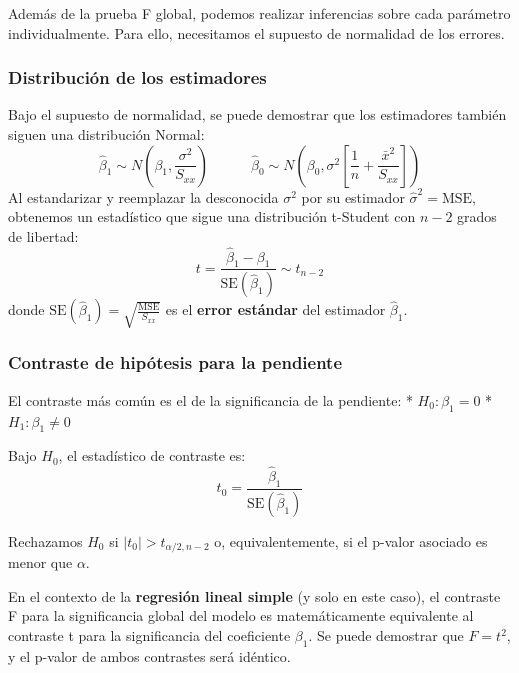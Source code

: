 \documentclass[
  letterpaper,
  DIV=11,
  numbers=noendperiod]{scrreprt}
\begin{document}
Además de la prueba F global, podemos realizar inferencias sobre cada
parámetro individualmente. Para ello, necesitamos el supuesto de
normalidad de los errores.

\subsubsection{Distribución de los
estimadores}\label{distribuciuxf3n-de-los-estimadores}

Bajo el supuesto de normalidad, se puede demostrar que los estimadores
también siguen una distribución Normal: \[
\hat{\beta}_1 \sim N\left(\beta_1, \frac{\sigma^2}{S_{xx}}\right) \quad \quad \quad \hat{\beta}_0 \sim N\left(\beta_0, \sigma^2 \left[ \frac{1}{n} + \frac{\bar{x}^2}{S_{xx}} \right]\right)
\] Al estandarizar y reemplazar la desconocida \(\sigma^2\) por su
estimador \(\hat{\sigma}^2 = \text{MSE}\), obtenemos un estadístico que
sigue una distribución t-Student con \(n-2\) grados de libertad: \[
t = \frac{\hat{\beta}_1 - \beta_1}{\text{SE}(\hat{\beta}_1)} \sim t_{n-2}\]
donde \(\text{SE}(\hat{\beta}_1) = \sqrt{\frac{\text{MSE}}{S_{xx}}}\) es
el \textbf{error estándar} del estimador \(\hat{\beta}_1\).

\subsubsection{Contraste de hipótesis para la
pendiente}\label{contraste-de-hipuxf3tesis-para-la-pendiente}

El contraste más común es el de la significancia de la pendiente: *
\(H_0: \beta_1 = 0\) * \(H_1: \beta_1 \neq 0\)

Bajo \(H_0\), el estadístico de contraste es: \[
t_0 = \frac{\hat{\beta}_1}{\text{SE}(\hat{\beta}_1)}\]

Rechazamos \(H_0\) si \(|t_0| > t_{\alpha/2, n-2}\) o, equivalentemente,
si el p-valor asociado es menor que \(\alpha\).

\begin{tcolorbox}[enhanced jigsaw, leftrule=.75mm, breakable, colbacktitle=quarto-callout-note-color!10!white, bottomrule=.15mm, colframe=quarto-callout-note-color-frame, toprule=.15mm, colback=white, coltitle=black, bottomtitle=1mm, left=2mm, title=\textcolor{quarto-callout-note-color}{\faInfo}\hspace{0.5em}{Relación entre el contraste F y el contraste t}, opacityback=0, arc=.35mm, opacitybacktitle=0.6, toptitle=1mm, titlerule=0mm, rightrule=.15mm]

En el contexto de la \textbf{regresión lineal simple} (y solo en este
caso), el contraste F para la significancia global del modelo es
matemáticamente equivalente al contraste t para la significancia del
coeficiente \(\beta_1\). Se puede demostrar que \(F = t^2\), y el
p-valor de ambos contrastes será idéntico.

\end{tcolorbox}
\end{document}
